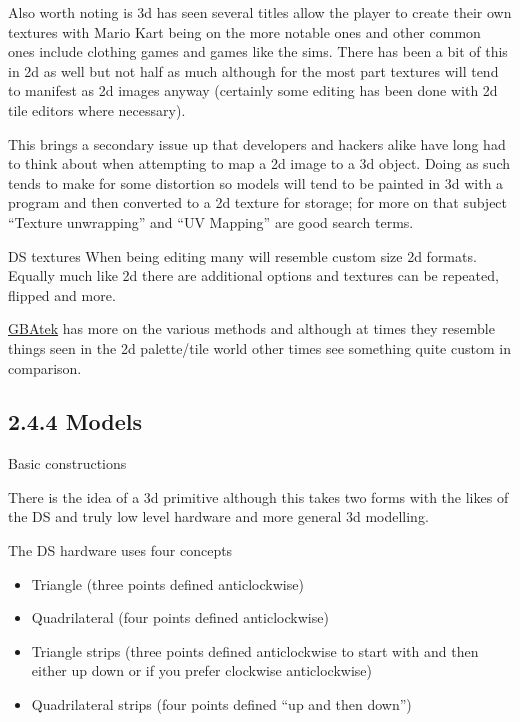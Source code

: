 \documentclass[
]{book}
\providecommand{\tightlist}{%
  \setlength{\itemsep}{0pt}\setlength{\parskip}{0pt}}
\begin{document}
Also worth noting is 3d has seen several titles allow the player to create their own textures with Mario Kart being on the more notable ones and other common ones include clothing games and games like the sims. There has been a bit of this in 2d as well but not half as much although for the most part textures will tend to manifest as 2d images anyway (certainly some editing has been done with 2d tile editors where necessary).

This brings a secondary issue up that developers and hackers alike have long had to think about when attempting to map a 2d image to a 3d object. Doing as such tends to make for some distortion so models will tend to be painted in 3d with a program and then converted to a 2d texture for storage; for more on that subject ``Texture unwrapping'' and ``UV Mapping'' are good search terms.

DS textures When being editing many will resemble custom size 2d formats. Equally much like 2d there are additional options and textures can be repeated, flipped and more.

\href{http://problemkaputt.de/gbatek.htm\#ds3dtextureattributes}{GBAtek} has more on the various methods and although at times they resemble things seen in the 2d palette/tile world other times see something quite custom in comparison.

\hypertarget{models}{%
\subsection{2.4.4 Models}\label{models}}

Basic constructions

There is the idea of a 3d primitive although this takes two forms with the likes of the DS and truly low level hardware and more general 3d modelling.

The DS hardware uses four concepts

\begin{itemize}
\tightlist
\item
  Triangle (three points defined anticlockwise)
\item
  Quadrilateral (four points defined anticlockwise)
\item
  Triangle strips (three points defined anticlockwise to start with and then either up down or if you prefer clockwise anticlockwise)
\item
  Quadrilateral strips (four points defined ``up and then down'')
\end{itemize}
\end{document}
